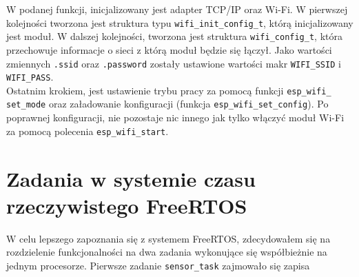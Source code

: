 W podanej funkcji, inicjalizowany jest adapter TCP/IP oraz Wi-Fi. W pierwszej kolejności
tworzona jest struktura typu \verb+wifi_init_config_t+, którą inicjalizowany jest moduł.
W dalszej kolejności, tworzona jest struktura \verb+wifi_config_t+, która przechowuje 
informacje o sieci z którą moduł będzie się łączył. Jako wartości zmiennych \verb+.ssid+ 
oraz \verb+.password+ zostały ustawione wartości makr \verb+WIFI_SSID+ i \verb+WIFI_PASS+.\\

Ostatnim krokiem, jest ustawienie trybu pracy za pomocą funkcji \verb+esp_wifi_+
\verb+set_mode+ 
oraz załadowanie konfiguracji (funkcja \verb+esp_wifi_set_config+). Po poprawnej konfiguracji,
nie pozostaje nic innego jak tylko włączyć moduł Wi-Fi za pomocą polecenia \verb+esp_wifi_start+.


\section{Zadania w systemie czasu rzeczywistego FreeRTOS}
\label{projekt_taski}

W celu lepszego zapoznania się z systemem FreeRTOS, zdecydowałem się na rozdzielenie 
funkcjonalności na dwa zadania wykonujące się współbieżnie na jednym procesorze. 
Pierwsze zadanie \verb+sensor_task+ zajmowało się zapisa

\section{}
